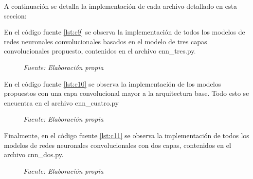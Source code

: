 A continuación se detalla la implementación de cada archivo detallado en esta seccion:

En el código fuente \ref{lst:c9} se observa la implementación de todos los modelos de redes neuronales convolucionales basados en el modelo de tres capas convolucionales propuesto, contenidos en el archivo cnn\_tres.py.


\vspace{-1.3em} %

\begin{figure}[h!]
	\centering %
	\textit{Fuente: Elaboración propia}
\end{figure}


En el código fuente \ref{lst:c10} se observa la implementación de los modelos propuestos con una capa convolucional mayor a la arquitectura base. Todo esto se encuentra en el archivo cnn\_cuatro.py


\vspace{-1.3em} %

\begin{figure}[h!]
	\centering %
	\textit{Fuente: Elaboración propia}
\end{figure}


Finalmente, en el código fuente \ref{lst:c11} se observa la implementación de todos los modelos de redes neuronales convolucionales con dos capas, contenidos en el archivo cnn\_dos.py.


\vspace{-1.3em} %

\begin{figure}[h!]
	\centering %
	\textit{Fuente: Elaboración propia}
\end{figure}



